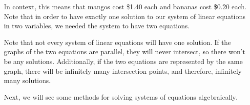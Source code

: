 \documentclass[nooutcomes]{ximera}
\begin{document}
In context, this means that mangos cost \$1.40 each and bananas cost \$0.20 each. Note that in order to have exactly one solution to our system of linear equations in two variables, we needed the system to have two equations.

Note that not every system of linear equations will have one solution. If the graphs of the two equations are parallel, they will never intersect, so there won't be any solutions. Additionally, if the two equations are represented by the same graph, there will be infinitely many intersection points, and therefore, infinitely many solutions. 

Next, we will see some methods for solving systems of equations algebraically. 

%
%
%
%
%
%
%
%
%
%
%
%
\end{document}
